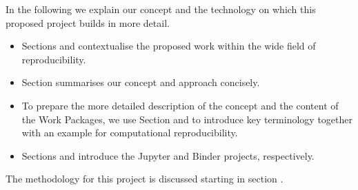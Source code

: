 In the following we explain our concept and the technology on which this
proposed project builds in more detail.
\begin{itemize}
\item Sections  and
   contextualise the proposed work
  within the wide field of reproducibility.
\item Section  summarises our concept and
  approach concisely.

\item To prepare the more detailed description of the concept and the content of
  the Work Packages, we use Section  and
   to introduce key terminology together with an
  example for computational reproducibility.

\item Sections  and 
  introduce the Jupyter and Binder projects, respectively.

\end{itemize}

\noindent The methodology for this project is discussed starting in section
.




%
%
%
%
%
%
%
%

